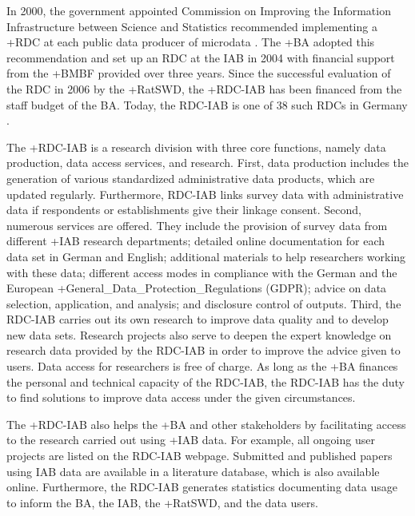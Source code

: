 \documentclass[
]{WileySix}
\begin{document}
In 2000, the government appointed Commission on Improving the Information Infrastructure between Science and Statistics recommended implementing a +RDC\textbar{} at each public data producer of microdata \citep{kvikommissionzurverbesserungderinformationelleninfrastrukturzwischenwissenschaftundstatistik2001}. The +BA\textbar{} adopted this recommendation and set up an RDC at the IAB in 2004 with financial support from the +BMBF\textbar{} provided over three years. Since the successful evaluation of the RDC in 2006 by the +RatSWD\textbar, the +RDC-IAB\textbar{} has been financed from the staff budget of the BA. Today, the RDC-IAB is one of 38 such RDCs in Germany \citep{germandataforum}.

The +RDC-IAB\textbar{} is a research division with three core functions, namely data production, data access services, and research. First, data production includes the generation of various standardized administrative data products, which are updated regularly. Furthermore, RDC-IAB links survey data with administrative data if respondents or establishments give their linkage consent. Second, numerous services are offered. They include the provision of survey data from different +IAB\textbar{} research departments; detailed online documentation for each data set in German and English; additional materials to help researchers working with these data; different access modes in compliance with the German and the European +General\_Data\_Protection\_Regulations\textbar{} (GDPR); advice on data selection, application, and analysis; and disclosure control of outputs. Third, the RDC-IAB carries out its own research to improve data quality and to develop new data sets. Research projects also serve to deepen the expert knowledge on research data provided by the RDC-IAB in order to improve the advice given to users. Data access for researchers is free of charge. As long as the +BA\textbar{} finances the personal and technical capacity of the RDC-IAB, the RDC-IAB has the duty to find solutions to improve data access under the given circumstances.

The +RDC-IAB\textbar{} also helps the +BA\textbar{} and other stakeholders by facilitating access to the research carried out using +IAB\textbar{} data. For example, all ongoing user projects are listed on the RDC-IAB webpage. Submitted and published papers using IAB data are available in a literature database, which is also available online. Furthermore, the RDC-IAB generates statistics documenting data usage to inform the BA, the IAB, the +RatSWD\textbar, and the data users.
\end{document}
